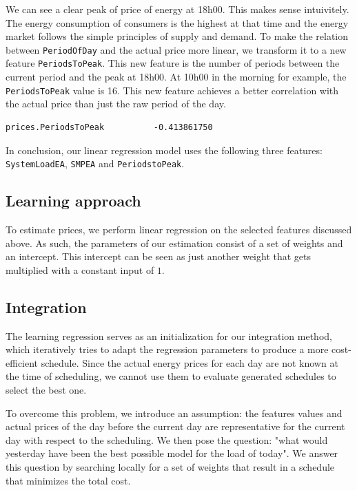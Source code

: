 \documentclass{article}
\begin{document}
We can see a clear peak of price of energy at 18h00. This makes sense intuivitely. The energy consumption of consumers is the highest at that time and the energy market follows the simple principles of supply and demand. To make the relation between \verb|PeriodOfDay| and the actual price more linear, we transform it to a new feature \verb|PeriodsToPeak|. This new feature is the number of periods between the current period and the peak at 18h00. At 10h00 in the morning for example, the \verb|PeriodsToPeak| value is 16. This new feature achieves a better correlation with the actual price than just the raw period of the day.
\begin{verbatim}
prices.PeriodsToPeak          -0.413861750
\end{verbatim}
In conclusion, our linear regression model uses the following three features: \verb|SystemLoadEA|, \verb|SMPEA| and \verb|PeriodstoPeak|.

\subsection{Learning approach}
To estimate prices, we perform linear regression on the selected features discussed above. As such, the parameters of our estimation consist of a set of weights and an intercept. This intercept can be seen as just another weight that gets multiplied with a constant input of $1$. 

\subsection{Integration}
The learning regression serves as an initialization for our integration method, which iteratively tries to adapt the regression parameters to produce a more cost-efficient schedule. Since the actual energy prices for each day are not known at the time of scheduling, we cannot use them to evaluate generated schedules to select the best one.

To overcome this problem, we introduce an assumption: the features values and actual prices of the day before the current day are representative for the current day with respect to the scheduling. We then pose the question: "what would yesterday have been the best possible model for the load of today". We answer this question by searching locally for a set of weights that result in a schedule that minimizes the total cost.
\end{document}
